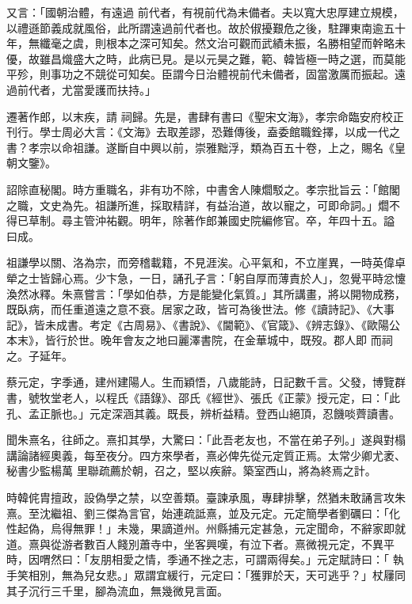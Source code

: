 \begin{pinyinscope}
 又言：「國朝治體，有遠過
 前代者，有視前代為未備者。夫以寬大忠厚建立規模，以禮遜節義成就風俗，此所謂遠過前代者也。故於俶擾艱危之後，駐蹕東南逾五十年，無纖毫之虞，則根本之深可知矣。然文治可觀而武績未振，名勝相望而幹略未優，故雖昌熾盛大之時，此病已見。是以元昊之難，範、韓皆極一時之選，而莫能平殄，則事功之不競從可知矣。臣謂今日治體視前代未備者，固當激厲而振起。遠過前代者，尤當愛護而扶持。」



 遷著作郎，以末疾，請
 祠歸。先是，書肆有書曰《聖宋文海》，孝宗命臨安府校正刊行。學士周必大言：《文海》去取差謬，恐難傳後，盍委館職銓擇，以成一代之書？孝宗以命祖謙。遂斷自中興以前，崇雅黜浮，類為百五十卷，上之，賜名《皇朝文鑒》。



 詔除直秘閣。時方重職名，非有功不除，中書舍人陳爓駁之。孝宗批旨云：「館閣之職，文史為先。祖謙所進，採取精詳，有益治道，故以寵之，可即命詞。」爓不得已草制。尋主管沖祐觀。明年，除著作郎兼國史院編修官。卒，年四十五。謚
 曰成。



 祖謙學以關、洛為宗，而旁稽載籍，不見涯涘。心平氣和，不立崖異，一時英偉卓犖之士皆歸心焉。少卞急，一日，誦孔子言：「躬自厚而薄責於人」，忽覺平時忿懥渙然冰釋。朱熹嘗言：「學如伯恭，方是能變化氣質。」其所講畫，將以開物成務，既臥病，而任重道遠之意不衰。居家之政，皆可為後世法。修《讀詩記》、《大事記》，皆未成書。考定《古周易》、《書說》、《閫範》、《官箴》、《辨志錄》、《歐陽公本末》，皆行於世。晚年會友之地曰麗澤書院，在金華城中，既歿。郡人即
 而祠之。子延年。



 蔡元定，字季通，建州建陽人。生而穎悟，八歲能詩，日記數千言。父發，博覽群書，號牧堂老人，以程氏《語錄》、邵氏《經世》、張氏《正蒙》授元定，曰：「此孔、孟正脈也。」元定深涵其義。既長，辨析益精。登西山絕頂，忍饑啖薺讀書。



 聞朱熹名，往師之。熹扣其學，大驚曰：「此吾老友也，不當在弟子列。」遂與對榻講論諸經奧義，每至夜分。四方來學者，熹必俾先從元定質正焉。太常少卿尤袤、秘書少監楊萬
 里聯疏薦於朝，召之，堅以疾辭。築室西山，將為終焉之計。



 時韓侂胄擅政，設偽學之禁，以空善類。臺諫承風，專肆排擊，然猶未敢誦言攻朱熹。至沈繼祖、劉三傑為言官，始連疏詆熹，並及元定。元定簡學者劉礪曰：「化性起偽，烏得無罪！」未幾，果謫道州。州縣捕元定甚急，元定聞命，不辭家即就道。熹與從游者數百人餞別蕭寺中，坐客興嘆，有泣下者。熹微視元定，不異平時，因喟然曰：「友朋相愛之情，季通不挫之志，可謂兩得矣。」元定賦詩曰：「
 執手笑相別，無為兒女悲。」眾謂宜緩行，元定曰：「獲罪於天，天可逃乎？」杖屨同其子沉行三千里，腳為流血，無幾微見言面。




\end{pinyinscope}
